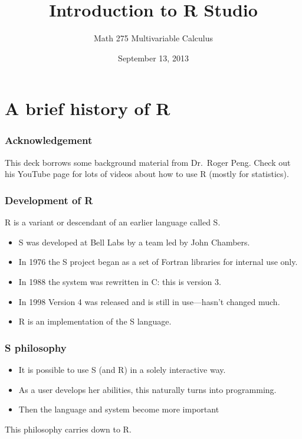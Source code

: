 \documentclass[11pt,ignorenonframetext,aspectratio=169]{beamer}
\title{Introduction to R Studio}
\author{Math 275 Multivariable Calculus}
\date{September 13, 2013 }
\begin{document}
\frame{\titlepage}

\section{A brief history of R}

\begin{frame}\frametitle{Acknowledgement}

This deck borrows some background material from Dr.~Roger Peng. Check
out his YouTube page for lots of videos about how to use R (mostly for
statistics).

\end{frame}

\begin{frame}\frametitle{Development of R}

R is a variant or descendant of an earlier language called S.

\begin{itemize}[<+->]

\item
  S was developed at Bell Labs by a team led by John Chambers.
\item
  In 1976 the S project began as a set of Fortran libraries for internal
  use only.
\item
  In 1988 the system was rewritten in C: this is version 3.
\item
  In 1998 Version 4 was released and is still in use---hasn't changed
  much.
\item
  R is an implementation of the S language.
\end{itemize}

\end{frame}

\begin{frame}\frametitle{S philosophy}

\begin{itemize}[<+->]

\item
  It is possible to use S (and R) in a solely interactive way.
\item
  As a user develops her abilities, this naturally turns into
  programming.
\item
  Then the language and system become more important
\end{itemize}

This philosophy carries down to R.

\end{frame}
\end{document}
